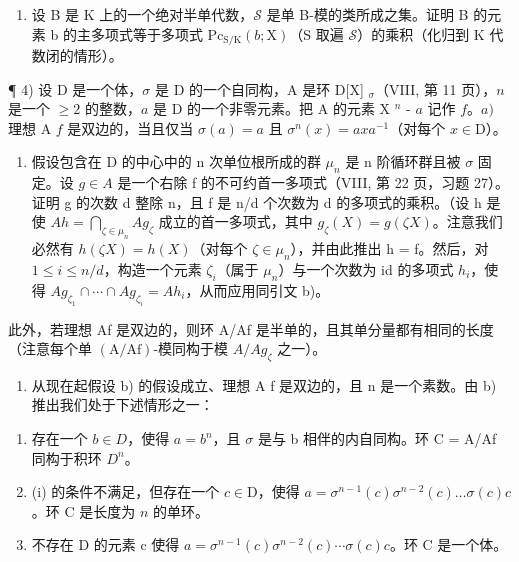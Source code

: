 \begin{enumerate}
\def\labelenumi{\alph{enumi})}
\setcounter{enumi}{1}
\tightlist
\item
  设 B 是 K 上的一个绝对半单代数，\(\mathcal{S}\) 是单 B-模的类所成之集。证明 B 的元素 b 的主多项式等于多项式 \(\mathrm{Pc}_{\mathrm{S}/\mathrm{K}}(b;\mathrm{X})\)（S 取遍 \(\mathcal{S}\)）的乘积（化归到 K 代数闭的情形）。
\end{enumerate}

¶ 4) 设 D 是一个体，\(\sigma\) 是 D 的一个自同构，A 是环 D{[}X{]} \(_{\sigma}\)（VIII, 第 11 页），\(n\) 是一个 \(\geqslant 2\) 的整数，\(a\) 是 D 的一个非零元素。把 A 的元素 X \(^{n}\) - \(a\) 记作 \(f\)。\(a)\) 理想 A \(f\) 是双边的，当且仅当 \(\sigma(a) = a\) 且 \(\sigma^{n}(x) = axa^{-1}\)（对每个 \(x \in \mathrm{D}\)）。

\begin{enumerate}
\def\labelenumi{\alph{enumi})}
\setcounter{enumi}{1}
\tightlist
\item
  假设包含在 D 的中心中的 n 次单位根所成的群 \(\mu_{n}\) 是 n 阶循环群且被 \(\sigma\) 固定。设 \(g \in A\) 是一个右除 f 的不可约首一多项式（VIII, 第 22 页，习题 27）。证明 g 的次数 d 整除 n，且 f 是 n/d 个次数为 d 的多项式的乘积。（设 h 是使 \(Ah = \bigcap_{\zeta \in \mu_{n}} Ag_{\zeta}\) 成立的首一多项式，其中 \(g_{\zeta}(X) = g(\zeta X)\)。注意我们必然有 \(h(\zeta X) = h(X)\)（对每个 \(\zeta \in \mu_{n}\)），并由此推出 h = f。然后，对 \(1 \leqslant i \leqslant n/d\)，构造一个元素 \(\zeta_{i}\)（属于 \(\mu_{n}\)）与一个次数为 id 的多项式 \(h_{i}\)，使得 \(Ag_{\zeta_{1}} \cap \cdots \cap Ag_{\zeta_{i}} = Ah_{i}\)，从而应用同引文 b)。
\end{enumerate}

此外，若理想 Af 是双边的，则环 A/Af 是半单的，且其单分量都有相同的长度（注意每个单 \((\mathrm{A}/\mathrm{Af})\)-模同构于模 \(A/Ag_{\zeta}\) 之一）。

\begin{enumerate}
\def\labelenumi{\alph{enumi})}
\setcounter{enumi}{2}
\tightlist
\item
  从现在起假设 b) 的假设成立、理想 A f 是双边的，且 n 是一个素数。由 b) 推出我们处于下述情形之一：
\end{enumerate}

\begin{enumerate}
\def\labelenumi{(\roman{enumi})}
\item
  存在一个 \(b \in D\)，使得 \(a = b^{n}\)，且 \(\sigma\) 是与 b 相伴的内自同构。环 C = A/Af 同构于积环 \(D^{n}\)。
\item
  (i) 的条件不满足，但存在一个 \(c \in \mathrm{D}\)，使得 \(a = \sigma^{n-1}(c)\sigma^{n-2}(c)\ldots\sigma(c)c\)。环 C 是长度为 \(n\) 的单环。
\item
  不存在 D 的元素 c 使得 \(a = \sigma^{n-1}(c) \sigma^{n-2}(c) \cdots \sigma(c) c\)。环 C 是一个体。
\end{enumerate}

